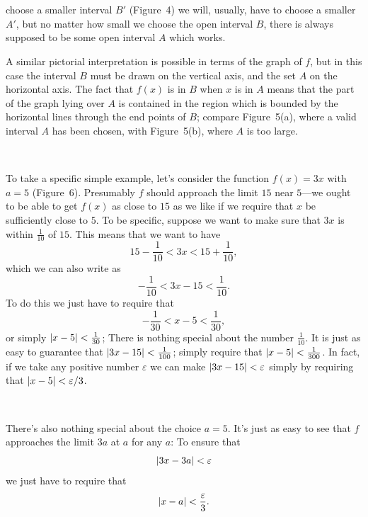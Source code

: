 \begin{center}
\\[0.6em]
\end{center}
\begin{center}
\\[0.6em]
\end{center}
choose a smaller interval $B'$ (Figure~4) we will, usually, have to choose a
smaller $A'$, but no matter how small we choose the open interval $B$, there is
always supposed to be some open interval $A$ which works.

A similar pictorial interpretation is possible in terms of the graph of $f$,
but in this case the interval $B$ must be drawn on the vertical axis, and the
set $A$ on the horizontal axis. The fact that $f(x)$ is in $B$ when $x$ is in
$A$ means that the part of the graph lying over $A$ is contained in the region
which is bounded by the horizontal lines through the end points of $B$;
compare Figure~5(a), where a valid interval $A$ has been chosen, with
Figure~5(b), where $A$ is too large.

\begin{center}
\\[0.6em]
\end{center}
To take a specific simple example, let's consider the function $f(x)=3x$ with
$a=5$ (Figure~6). Presumably $f$ should approach the limit $15$ near $5$---we
ought to be able to get $f(x)$ as close to $15$ as we like if we require that
$x$ be sufficiently close to $5$. To be specific, suppose we want to make sure
that $3x$ is within $\frac{1}{10}$ of $15$. This means that we want to have
\[
15 - \frac{1}{10} < 3x < 15 + \frac{1}{10},
\]
which we can also write as
\[
-\frac{1}{10} < 3x - 15 < \frac{1}{10}.
\]
To do this we just have to require that
\[
-\frac{1}{30} < x - 5 < \frac{1}{30},
\]
or simply $\lvert x-5\rvert<\frac{1}{30}$; There is nothing special about the number
$\frac{1}{10}$. It is just as easy to guarantee that
$\lvert3x-15\rvert<\frac{1}{100}$; simply require that
$\lvert x-5\rvert<\frac{1}{300}$. In fact, if we take any positive number
$\varepsilon$ we can make $\lvert3x-15\rvert<\varepsilon$ simply by requiring that
$\lvert x-5\rvert<\varepsilon/3$.

\begin{center}
\\[0.6em]
\end{center}
There's also nothing special about the choice $a=5$. It's just as easy to see
that $f$ approaches the limit $3a$ at $a$ for any $a$: To ensure that
\[
\lvert3x-3a\rvert<\varepsilon
\]
we just have to require that
\[
\lvert x-a\rvert<\frac{\varepsilon}{3}.
\]

